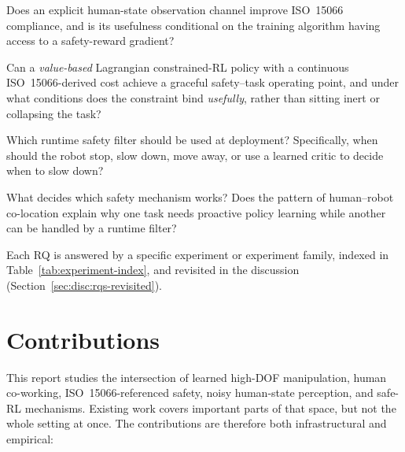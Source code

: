 \documentclass[11pt,a4paper]{report}
\newcommand{\iso}{ISO~15066}
\begin{document}
\begin{description}[leftmargin=2em,style=nextline]
\item[RQ1] Does an explicit human-state observation channel improve
  \iso{} compliance, and is its usefulness conditional on the
  training algorithm having access to a safety-reward gradient?
\item[RQ2] Can a \emph{value-based} Lagrangian constrained-RL policy
  with a continuous \iso{}-derived cost achieve a graceful
  safety--task operating point, and under what conditions does the
  constraint bind \emph{usefully}, rather than sitting inert or
  collapsing the task?
\item[RQ3] Which runtime safety filter should be used at deployment?
  Specifically, when should the robot stop, slow down, move away, or
  use a learned critic to decide when to slow down?
\item[RQ4] What decides which safety mechanism works? Does the pattern
  of human--robot co-location explain why one task needs proactive
  policy learning while another can be handled by a runtime filter?
\end{description}

Each RQ is answered by a specific experiment or experiment family,
indexed in Table~\ref{tab:experiment-index}, and revisited in the
discussion (Section~\ref{sec:disc:rqs-revisited}).

\section{Contributions}
\label{sec:intro:contributions}

This report studies the intersection of learned high-DOF manipulation,
human co-working, \iso{}-referenced safety, noisy human-state
perception, and safe-RL mechanisms. Existing work covers important
parts of that space, but not the whole setting at once. The
contributions are therefore both infrastructural and empirical:
\end{document}
